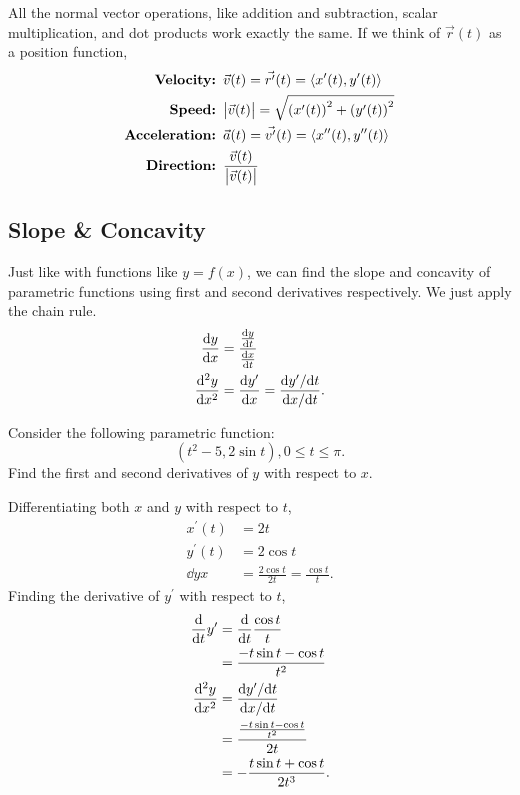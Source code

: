 All the normal vector operations, like addition and subtraction, scalar multiplication, and dot products work exactly the same.
If we think of $\vec{r}(t)$ as a position function,
\begin{align*}
	\textbf{Velocity: }& \vec{v}(t) = \vec{r^\prime}(t) = \langle x^\prime(t), y^\prime(t) \rangle \\
	\textbf{Speed: }& \big\lvert \vec{v}(t) \big\rvert = \sqrt{\left(x^\prime(t)\right)^2 + \left(y^\prime(t)\right)^2} \\
	\textbf{Acceleration: }& \vec{a}(t) = \vec{v^\prime}(t) = \langle x^{\prime\prime}(t), y^{\prime\prime}(t) \rangle \\
	\textbf{Direction: }& \frac{\vec{v}(t)}{\big\lvert \vec{v}(t) \big\rvert} \\
\end{align*}

\subsection{Slope \& Concavity}
Just like with functions like $y=f(x)$, we can find the slope and concavity of parametric functions using first and second derivatives respectively.
We just apply the chain rule.
\begin{align*}
	\frac{\mathrm{d} y}{\mathrm{d} x} &= \frac{\frac{\mathrm{d} y}{\mathrm{d} t}}{\frac{\mathrm{d} x}{\mathrm{d} t}} \\
	\frac{\mathrm{d} ^2y}{\mathrm{d} x^2} &= \frac{\mathrm{d} y^\prime}{\mathrm{d} x} = \frac{\mathrm{d} y^\prime/\mathrm{d} t}{\mathrm{d} x/\mathrm{d} t}.
\end{align*}

\begin{example}
	Consider the following parametric function:
	\begin{equation*}
		(t^2-5, 2\sin{t}), 0\leq t\leq\pi.
	\end{equation*}
	Find the first and second derivatives of $y$ with respect to $x$.
\end{example}
\begin{answer}
	Differentiating both $x$ and $y$ with respect to $t$,
	\begin{align*}
		x^\prime(t) &= 2t \\
		y^\prime(t) &= 2\cos{t} \\
		\dd{y}{x} &= \frac{2\cos{t}}{2t} = \frac{\cos{t}}{t}.
	\end{align*}
	Finding the derivative of $y^\prime$ with respect to $t$,
	\begin{align*}
		\frac{\mathrm{d} }{\mathrm{d} t}y^\prime &= \frac{\mathrm{d} }{\mathrm{d} t}\frac{\cos{t}}{t} \\
		&= \frac{-t\sin{t}-\cos{t}}{t^2} \\
		\frac{\mathrm{d} ^2y}{\mathrm{d} x^2} &= \frac{\mathrm{d} y^\prime/\mathrm{d} t}{\mathrm{d} x/\mathrm{d} t} \\
		&= \frac{\frac{-t\sin{t}-\cos{t}}{t^2}}{2t} \\
		&= -\frac{t\sin{t}+\cos{t}}{2t^3}.
	\end{align*}
\end{answer}

